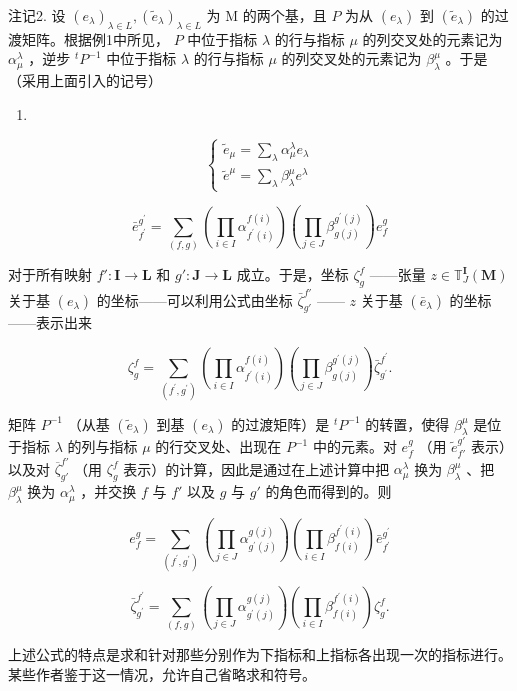 注记2. 设 \((e_{\lambda})_{\lambda \in L}, (\tilde{e}_{\lambda})_{\lambda \in L}\) 为 M 的两个基，且 \(P\) 为从 \((e_{\lambda})\) 到 \((\tilde{e}_{\lambda})\) 的过渡矩阵。根据例1中所见， \(P\) 中位于指标 \(\lambda\) 的行与指标 \(\mu\) 的列交叉处的元素记为 \(\alpha_{\mu}^{\lambda}\) ，逆步 \(^{t}P^{-1}\) 中位于指标 \(\lambda\) 的行与指标 \(\mu\) 的列交叉处的元素记为 \(\beta_{\lambda}^{\mu}\) 。于是（采用上面引入的记号）

\begin{enumerate}
\def\labelenumi{(\arabic{enumi})}
\setcounter{enumi}{18}
\tightlist
\item
\end{enumerate}

\[
\left\{ \begin{array}{l} \tilde {e} _ {\mu} = \sum_ {\lambda} \alpha_ {\mu} ^ {\lambda} e _ {\lambda} \\ \tilde {e} ^ {\mu} = \sum_ {\lambda} \beta_ {\lambda} ^ {\mu} e ^ {\lambda} \end{array} \right.\tag{20}
\]

\[
\bar {e} _ {f ^ {\prime}} ^ {g ^ {\prime}} = \sum_ {(f, g)} \left(\prod_ {i \in I} \alpha_ {f ^ {\prime} (i)} ^ {f (i)}\right) \left(\prod_ {j \in J} \beta_ {g (j)} ^ {g ^ {\prime} (j)}\right) e _ {f} ^ {g}
\]

对于所有映射 \(f': \mathbf{I} \to \mathbf{L}\) 和 \(g': \mathbf{J} \to \mathbf{L}\) 成立。于是，坐标 \(\zeta_g^f\) ——张量 \(z \in \mathbb{T}_J^{\mathbf{I}}(\mathbf{M})\) 关于基 \((e_{\lambda})\) 的坐标——可以利用公式由坐标 \(\bar{\zeta}_{g'}^{f'}\) —— \(z\) 关于基 \((\bar{e}_{\lambda})\) 的坐标——表示出来

\[
\zeta_ {g} ^ {f} = \sum_ {(f ^ {\prime}, g ^ {\prime})} \left(\prod_ {i \in I} \alpha_ {f ^ {\prime} (i)} ^ {f (i)}\right) \left(\prod_ {j \in J} \beta_ {g (j)} ^ {g ^ {\prime} (j)}\right) \bar {\zeta} _ {g ^ {\prime}} ^ {f ^ {\prime}}.\tag{21}
\]

矩阵 \(P^{-1}\) （从基 \((\tilde{e}_{\lambda})\) 到基 \((e_{\lambda})\) 的过渡矩阵）是 \(^{t}P^{-1}\) 的转置，使得 \(\beta_{\lambda}^{\mu}\) 是位于指标 \(\lambda\) 的列与指标 \(\mu\) 的行交叉处、出现在 \(P^{-1}\) 中的元素。对 \(e_{f}^{g}\) （用 \(\tilde{e}_{f'}^{g'}\) 表示）以及对 \(\overline{\zeta}_{g'}^{f'}\) （用 \(\zeta_{g}^{f}\) 表示）的计算，因此是通过在上述计算中把 \(\alpha_{\mu}^{\lambda}\) 换为 \(\beta_{\lambda}^{\mu}\) 、把 \(\beta_{\lambda}^{\mu}\) 换为 \(\alpha_{\mu}^{\lambda}\) ，并交换 \(f\) 与 \(f'\) 以及 \(g\) 与 \(g'\) 的角色而得到的。则

\[
e _ {f} ^ {g} = \sum_ {(f ^ {\prime}, g ^ {\prime})} \left(\prod_ {j \in J} \alpha_ {g ^ {\prime} (j)} ^ {g (j)}\right) \left(\prod_ {i \in I} \beta_ {f (i)} ^ {f ^ {\prime} (i)}\right) \bar {e} _ {f ^ {\prime}} ^ {g ^ {\prime}}\tag{22}
\]

\[
\bar {\zeta} _ {g ^ {\prime}} ^ {f ^ {\prime}} = \sum_ {(f, g)} \left(\prod_ {j \in J} \alpha_ {g ^ {\prime} (j)} ^ {g (j)}\right) \left(\prod_ {i \in I} \beta_ {f (i)} ^ {f ^ {\prime} (i)}\right) \zeta_ {g} ^ {f}.\tag{23}
\]

上述公式的特点是求和针对那些分别作为下指标和上指标各出现一次的指标进行。某些作者鉴于这一情况，允许自己省略求和符号。

